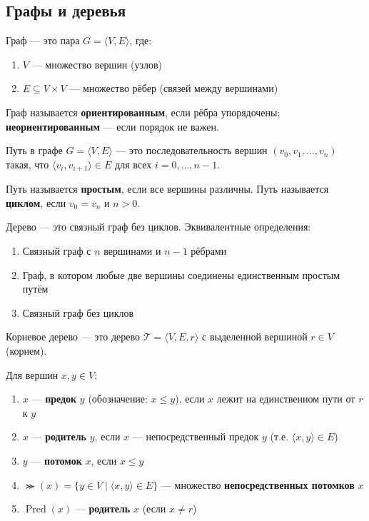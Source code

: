 \documentclass[11pt, a4paper]{extarticle}
\newcommand{\Tcal}{{\mathcal T}}
\renewcommand{\le}{\leqslant}
\newcommand{\Pred}{\mathop{\mathrm{Pred}}}
\begin{document}
\subsection{Графы и деревья}

\begin{definition}[Граф]
Граф --- это пара $G = \langle V, E \rangle$, где:
\begin{enumerate}
    \item $V$ --- множество вершин (узлов)
    \item $E \subseteq V \times V$ --- множество рёбер (связей между вершинами)
\end{enumerate}
Граф называется \textbf{ориентированным}, если рёбра упорядочены; \textbf{неориентированным} --- если порядок не важен.
\end{definition}

\begin{definition}
Путь в графе $G = \langle V, E \rangle$ --- это последовательность вершин $(v_0, v_1, \ldots, v_n)$ такая, что $\langle v_i, v_{i+1} \rangle \in E$ для всех $i = 0, \ldots, n-1$.

Путь называется \textbf{простым}, если все вершины различны. Путь называется \textbf{циклом}, если $v_0 = v_n$ и $n > 0$.
\end{definition}

\begin{definition}[Дерево]
Дерево --- это связный граф без циклов. Эквивалентные определения:
\begin{enumerate}
    \item Связный граф с $n$ вершинами и $n-1$ рёбрами
    \item Граф, в котором любые две вершины соединены единственным простым путём
    \item Связный граф без циклов
\end{enumerate}
\end{definition}

\begin{definition}
Корневое дерево --- это дерево $\Tcal = \langle V, E, r \rangle$ с выделенной вершиной $r \in V$ (корнем).

Для вершин $x, y \in V$:
\begin{enumerate}
    \item $x$ --- \textbf{предок} $y$ (обозначение: $x \le y$), если $x$ лежит на единственном пути от $r$ к $y$
    \item $x$ --- \textbf{родитель} $y$, если $x$ --- непосредственный предок $y$ (т.е. $\langle x, y \rangle \in E$)
    \item $y$ --- \textbf{потомок} $x$, если $x \le y$
    \item $\Succ(x) = \{y \in V \mid \langle x, y \rangle \in E\}$ --- множество \textbf{непосредственных потомков} $x$
    \item $\Pred(x)$ --- \textbf{родитель} $x$ (если $x \neq r$)
\end{enumerate}
\end{definition}
\end{document}
